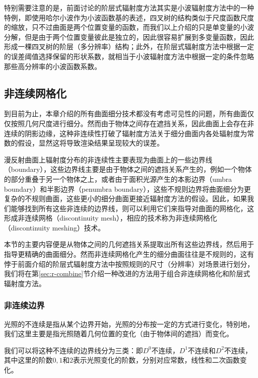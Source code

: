 特别需要注意的是，前面讨论的阶层式辐射度方法其实是小波辐射度方法中的一种特例，即使用哈尔小波作为小波函数基的表述，四叉树的结构类似于尺度函数尺度的缩放，只不过曲面是两个位置变量的函数，而我们以上介绍的只是单变量的小波分解，但是由于两个位置变量彼此是独立的，因此很容易扩展到多变量函数，因此形成一棵四叉树的阶层（多分辨率）结构；此外，在阶层式辐射度方法中根据一定的误差阈值选择保留的形状系数，就相当于小波辐射度方法中根据一定的条件忽略那些高分辨率的小波函数系数。





\subsection{非连续网格化}\label{sec:r-discontinuity-meshing}
到目前为止，本章介绍的所有曲面细分技术都没有考虑可见性的问题，所有曲面仅仅按照几何尺度进行细分。然而由于物体之间存在遮挡关系，因此曲面上会存在非连续的阴影边缘，这种非连续性打破了辐射度方法关于细分曲面内各处辐射度为常数的假设，显然这将导致渲染结果呈现较大的误差。

漫反射曲面上辐射度分布的非连续性主要表现为曲面上的一些边界线（boundary），这些边界线主要是由于物体之间的遮挡关系产生的，例如一个物体的部分重叠于另一个物体之上，或者由于面积光源产生的本影边界（umbra boundary）和半影边界（penumbra boundary），这些不规则边界将曲面细分为更复杂的不规则曲面，这些更小的细分曲面更接近辐射度方法的假设。因此，如果我们能够找到所有这些非连续的边界线，则可以利用它们来指导对曲面的网格化，这形成非连续网格（discontinuity mesh），相应的技术称为非连续网格化（discontinuity meshing）技术。

本节的主要内容便是从物体之间的几何遮挡关系提取出所有这些边界线，然后用于指导更精确的曲面细分。然而非连续网格化产生的细分曲面往往是不规则的，这有悖于前面介绍的阶层式辐射度方法中按照规则的尺寸（分辨率）对场景进行划分，我们将在第\ref{sec:r-combine}节介绍一种改进的方法用于组合非连续网格化和阶层式辐射度方法。




\subsubsection{非连续边界}
光照的不连续是指从某个边界开始，光照的分布按一定的方式进行变化，特别地，我们这里主要是指光照随着几何位置的变化（由于物体间的遮挡）而变化。

我们可以将这种不连续的边界线分为三类\cite{a:ADiscontinuityMeshingAlgorithmforAccurateRadiosity}：即$D^{0}$不连续，$D^{1}$不连续和$D^{2}$不连续，其中这里的阶数$0,1$和$2$表示光照变化的阶数，分别对应常数，线性和二次函数变化。

